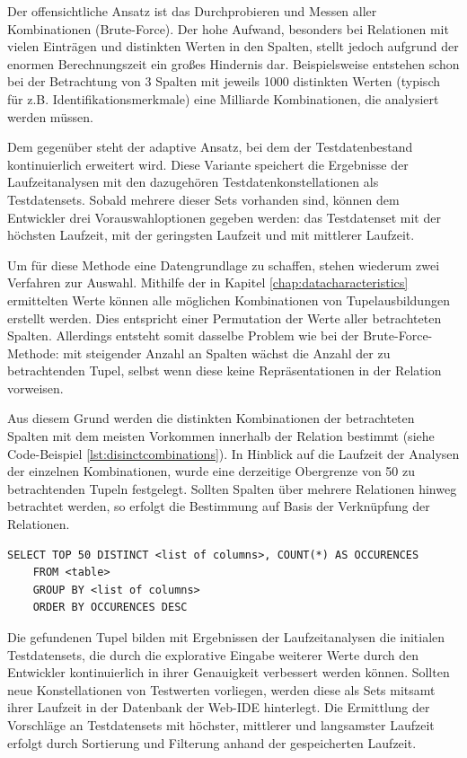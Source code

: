 Der offensichtliche Ansatz ist das Durchprobieren und Messen aller Kombinationen (Brute-Force).
Der hohe Aufwand, besonders bei Relationen mit vielen Einträgen und distinkten Werten in den Spalten, stellt jedoch aufgrund der enormen Berechnungszeit ein großes Hindernis dar.
Beispielsweise entstehen schon bei der Betrachtung von 3 Spalten mit jeweils 1000 distinkten Werten (typisch für z.B. Identifikationsmerkmale) eine Milliarde Kombinationen, die analysiert werden müssen.

Dem gegenüber steht der adaptive Ansatz, bei dem der Testdatenbestand kontinuierlich erweitert wird.
Diese Variante speichert die Ergebnisse der Laufzeitanalysen mit den dazugehören Testdatenkonstellationen als Testdatensets.
Sobald mehrere dieser Sets vorhanden sind, können dem Entwickler drei Vorauswahloptionen gegeben werden: das Testdatenset mit der höchsten Laufzeit, mit der geringsten Laufzeit und mit mittlerer Laufzeit.

Um für diese Methode eine Datengrundlage zu schaffen, stehen wiederum zwei Verfahren zur Auswahl.
Mithilfe der in Kapitel \ref{chap:datacharacteristics} ermittelten Werte können alle möglichen Kombinationen von Tupelausbildungen erstellt werden.
Dies entspricht einer Permutation der Werte aller betrachteten Spalten.
Allerdings entsteht somit dasselbe Problem wie bei der Brute-Force-Methode: mit steigender Anzahl an Spalten wächst die Anzahl der zu betrachtenden Tupel, selbst wenn diese keine Repräsentationen in der Relation vorweisen.

Aus diesem Grund werden die distinkten Kombinationen der betrachteten Spalten mit dem meisten Vorkommen innerhalb der Relation bestimmt (siehe Code-Beispiel \ref{lst:disinctcombinations}).
In Hinblick auf die Laufzeit der Analysen der einzelnen Kombinationen, wurde eine derzeitige Obergrenze von 50 zu betrachtenden Tupeln festgelegt.
Sollten Spalten über mehrere Relationen hinweg betrachtet werden, so erfolgt die Bestimmung auf Basis der Verknüpfung der Relationen.

\begin{lstlisting}[caption={Bestimmung distinkter Tupel anhand gegebener Spalten}, label={lst:disinctcombinations}, language=mySQL]
	SELECT TOP 50 DISTINCT <list of columns>, COUNT(*) AS OCCURENCES
	FROM <table>
	GROUP BY <list of columns>
	ORDER BY OCCURENCES DESC
\end{lstlisting}

Die gefundenen Tupel bilden mit Ergebnissen der Laufzeitanalysen die initialen Testdatensets, die durch die explorative Eingabe weiterer Werte durch den Entwickler kontinuierlich in ihrer Genauigkeit verbessert werden können.
Sollten neue Konstellationen von Testwerten vorliegen, werden diese als Sets mitsamt ihrer Laufzeit in der Datenbank der Web-IDE hinterlegt.
Die Ermittlung der Vorschläge an Testdatensets mit höchster, mittlerer und langsamster Laufzeit erfolgt durch Sortierung und Filterung anhand der gespeicherten Laufzeit.

